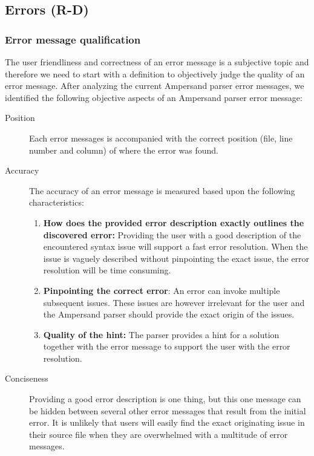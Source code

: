 \subsection{Errors (R-D)}
\label{subsec:analysis-errors}

\subsubsection{Error message qualification}
The user friendliness and correctness of an error message is a subjective topic and therefore we need to start with a definition to objectively judge the quality of an error message.
After analyzing the current Ampersand parser error messages, we identified the following objective aspects of an Ampersand parser error message:
%
\begin{description}
	\item [Position]
	Each error messages is accompanied with the correct position (file, line number and column) of where the error was found.
	\item [Accuracy]
	The accuracy of an error message is measured based upon the following characteristics:
	\begin{enumerate}
		\item	\textbf{\small How does the provided error description exactly outlines the discovered error:}
				Providing the user with a good description of the encountered syntax issue will support a fast error resolution.
				When the issue is vaguely described without pinpointing the exact issue, the error resolution will be time consuming.
		\item	\textbf{\small Pinpointing the correct error}:
				An error can invoke multiple subsequent issues. 
				These issues are however irrelevant for the user and the Ampersand parser should provide the exact origin of the issues.
		\item	\textbf{\small Quality of the hint:}
			The parser provides a hint for a solution together with the error message to support the user with the error resolution.
	\end {enumerate}
    \item[Conciseness]
	Providing a good error description is one thing, but this one message can be hidden between several other error messages that result from the initial error.
	It is unlikely that users will easily find the exact originating issue in their source file when they are overwhelmed with a multitude of error messages. %
\end {description}
